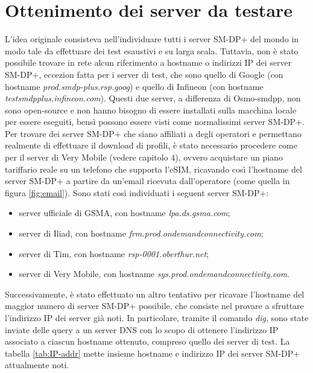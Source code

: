 \documentclass[10pt, oneside]{book}
\begin{document}
\section{Ottenimento dei server da testare}
L'idea originale consisteva nell'individuare tutti i server SM-DP+ del mondo in modo tale da effettuare dei test esaustivi e su larga scala. Tuttavia, non è stato possibile trovare in rete alcun riferimento a hostname o indirizzi IP dei server SM-DP+, eccezion fatta per i server di test, che sono quello di Google (con hostname \textit{prod.smdp-plus.rsp.goog}) e quello di Infineon (con hostname \textit{testsmdpplus.infineon.com}). Questi due server, a differenza di Osmo-smdpp, non sono open-source e non hanno bisogno di essere installati sulla macchina locale per essere eseguiti, bensì possono essere visti come normalissimi server SM-DP+.\\
Per trovare dei server SM-DP+ che siano affiliati a degli operatori e permettano realmente di effettuare il download di profili, è stato necessario procedere come per il server di Very Mobile (vedere capitolo 4), ovvero acquistare un piano tariffario reale su un telefono che supporta l'eSIM, ricavando così l'hostname del server SM-DP+ a partire da un'email ricevuta dall'operatore (come quella in figura \ref{fig:email}). Sono stati così individuati i seguent server SM-DP+:
\begin{itemize}
\item server ufficiale di GSMA, con hostname \textit{lpa.ds.gsma.com};
\item server di Iliad, con hostname \textit{frm.prod.ondemandconnectivity.com};
\item server di Tim, con hostname \textit{rsp-0001.oberthur.net};
\item server di Very Mobile, con hostname \textit{sys.prod.ondemandconnectivity.com}.
\end{itemize}
Successivamente, è stato effettuato un altro tentativo per ricavare l'hostname del maggior numero di server SM-DP+ possibile, che consiste nel provare a sfruttare l'indirizzo IP dei server già noti. In particolare, tramite il comando \textit{dig}, sono state inviate delle query a un server DNS con lo scopo di ottenere l'indirizzo IP associato a ciascun hostname ottenuto, compreso quello dei server di test. La tabella \ref{tab:IP-addr} mette insieme hostname e indirizzo IP dei server SM-DP+ attualmente noti.
\end{document}

